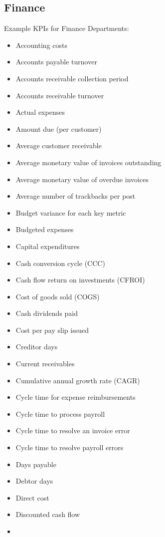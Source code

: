 \documentclass[]{book}
\providecommand{\tightlist}{%
  \setlength{\itemsep}{0pt}\setlength{\parskip}{0pt}}
\begin{document}
\subsection{Finance}\label{finance}

Example KPIs for Finance Departments:

\begin{itemize}
\tightlist
\item
  Accounting costs
\item
  Accounts payable turnover
\item
  Accounts receivable collection period
\item
  Accounts receivable turnover
\item
  Actual expenses
\item
  Amount due (per customer)
\item
  Average customer receivable
\item
  Average monetary value of invoices outstanding
\item
  Average monetary value of overdue invoices
\item
  Average number of trackbacks per post
\item
  Budget variance for each key metric
\item
  Budgeted expenses
\item
  Capital expenditures
\item
  Cash conversion cycle (CCC)
\item
  Cash flow return on investments (CFROI)
\item
  Cost of goods sold (COGS)
\item
  Cash dividends paid
\item
  Cost per pay slip issued
\item
  Creditor days
\item
  Current receivables
\item
  Cumulative annual growth rate (CAGR)
\item
  Cycle time for expense reimbursements
\item
  Cycle time to process payroll
\item
  Cycle time to resolve an invoice error
\item
  Cycle time to resolve payroll errors
\item
  Days payable
\item
  Debtor days
\item
  Direct cost
\item
  Discounted cash flow
\item

\end{itemize}
\end{document}
